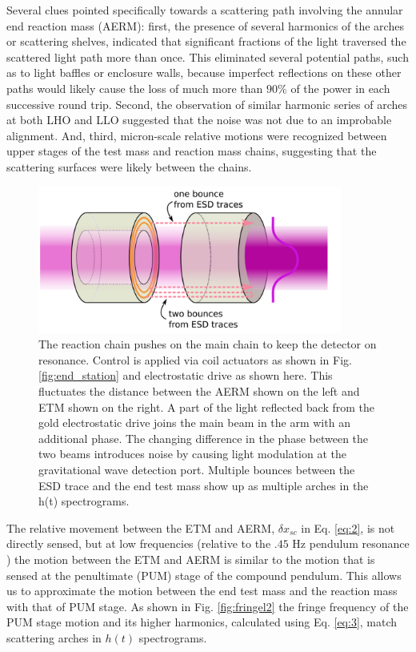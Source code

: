 \documentclass[12pt]{iopart}
\begin{document}
 
Several clues pointed specifically towards a scattering path involving the annular end reaction mass (AERM): first, the presence of several harmonics of the arches or scattering shelves, indicated that significant fractions of the light traversed the scattered light path more than once. This eliminated several potential paths, such as to light baffles or enclosure walls, because imperfect reflections on these other paths would likely cause the loss of much more than $90\%$ of the power in each successive round trip. Second, the observation of similar harmonic series of arches at both LHO and LLO suggested that the noise was not due to an improbable alignment. And, third, micron-scale relative motions were recognized between upper stages of the test mass and reaction mass chains, suggesting that the scattering surfaces were likely between the chains. %
 \begin{figure}[h]
    \centering
    \includegraphics[width=10cm]{mirror-diag1.png}
    \caption{The reaction chain pushes on the main chain  to keep the detector on resonance. Control is applied via coil actuators as shown in Fig. \ref{fig:end_station} and electrostatic drive as shown here. This fluctuates the distance between the AERM shown on the left and ETM shown on the right. A part of the light reflected back from the gold electrostatic drive joins the main beam in the arm with an additional phase. The changing difference in the phase between the two beams introduces noise by causing light modulation at the gravitational wave detection port. Multiple bounces between the ESD trace and the end test mass show up as multiple arches in the h(t) spectrograms.}
    \label{fig:mirror_diag}
\end{figure}
The relative movement between the ETM and AERM, ${\delta x_{sc}}$ in Eq. \ref{eq:2}, is not directly sensed, but at low frequencies (relative to the $.45$ Hz pendulum resonance ) the motion between the ETM and AERM is similar to the motion that is sensed at the penultimate (PUM) stage of the compound pendulum. This allows us to approximate the motion between the end test mass and the reaction mass with that of PUM stage.  As shown in Fig. \ref{fig:fringel2} the fringe frequency of the PUM stage motion and its higher harmonics, calculated using Eq. \ref{eq:3}, match scattering arches in $h(t)$ spectrograms.
 
\end{document}
